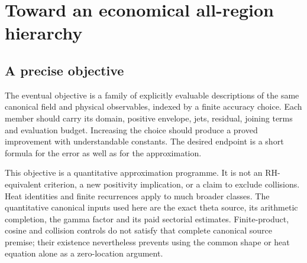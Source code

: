 \section{Toward an economical all-region hierarchy}
\label{sec:frontier}

\subsection{A precise objective}
The eventual objective is a family of explicitly evaluable descriptions
of the same canonical field and physical observables, indexed by a
finite accuracy choice. Each member should carry its domain, positive
envelope, jets, residual, joining terms and evaluation budget. Increasing
the choice should produce a proved improvement with understandable
constants. The desired endpoint is a short formula for the error as
well as for the approximation.

This objective is a quantitative approximation programme. It is not
an RH-equivalent criterion, a new positivity implication, or a claim
to exclude collisions. Heat identities and finite recurrences apply
to much broader classes. The quantitative canonical inputs used here
are the exact theta source, its arithmetic completion, the gamma
factor and its paid sectorial estimates. Finite-product, cosine and
collision controls do not satisfy that complete canonical source
premise; their existence nevertheless prevents using the common
shape or heat equation alone as a zero-location argument.

